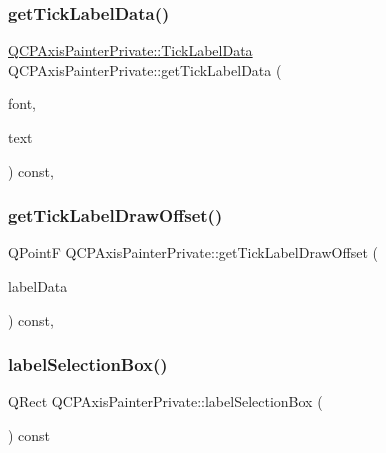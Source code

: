 \subsubsection{\texorpdfstring{get\+Tick\+Label\+Data()}{getTickLabelData()}}
{\footnotesize\ttfamily \hyperlink{struct_q_c_p_axis_painter_private_1_1_tick_label_data}{Q\+C\+P\+Axis\+Painter\+Private\+::\+Tick\+Label\+Data} Q\+C\+P\+Axis\+Painter\+Private\+::get\+Tick\+Label\+Data (\begin{DoxyParamCaption}\item[{const Q\+Font \&}]{font,  }\item[{const Q\+String \&}]{text }\end{DoxyParamCaption}) const\hspace{0.3cm}{\ttfamily [protected]}, {\ttfamily [virtual]}}

\mbox{\label{class_q_c_p_axis_painter_private_a6205b60c7d305854ffd7602139433f6e}} 
\subsubsection{\texorpdfstring{get\+Tick\+Label\+Draw\+Offset()}{getTickLabelDrawOffset()}}
{\footnotesize\ttfamily Q\+PointF Q\+C\+P\+Axis\+Painter\+Private\+::get\+Tick\+Label\+Draw\+Offset (\begin{DoxyParamCaption}\item[{const \hyperlink{struct_q_c_p_axis_painter_private_1_1_tick_label_data}{Tick\+Label\+Data} \&}]{label\+Data }\end{DoxyParamCaption}) const\hspace{0.3cm}{\ttfamily [protected]}, {\ttfamily [virtual]}}

\mbox{\label{class_q_c_p_axis_painter_private_ae7800667d15867040ada5f4bf027f070}} 
\subsubsection{\texorpdfstring{label\+Selection\+Box()}{labelSelectionBox()}}
{\footnotesize\ttfamily Q\+Rect Q\+C\+P\+Axis\+Painter\+Private\+::label\+Selection\+Box (\begin{DoxyParamCaption}{ }\end{DoxyParamCaption}) const\hspace{0.3cm}{\ttfamily [inline]}}

